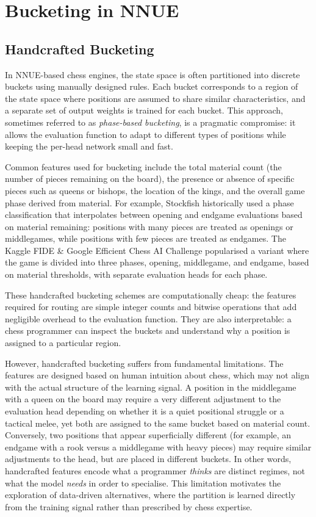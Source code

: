 \section{Bucketing in NNUE}\label{sec:nnue-bucketing}

\subsection{Handcrafted Bucketing}\label{sec:handcrafted-bucketing}

In NNUE-based chess engines, the state space is often partitioned into discrete buckets using manually designed rules. Each bucket corresponds to a region of the state space where positions are assumed to share similar characteristics, and a separate set of output weights is trained for each bucket. This approach, sometimes referred to as \emph{phase-based bucketing}, is a pragmatic compromise: it allows the evaluation function to adapt to different types of positions while keeping the per-head network small and fast.

Common features used for bucketing include the total material count (the number of pieces remaining on the board), the presence or absence of specific pieces such as queens or bishops, the location of the kings, and the overall game phase derived from material. For example, Stockfish historically used a phase classification that interpolates between opening and endgame evaluations based on material remaining: positions with many pieces are treated as openings or middlegames, while positions with few pieces are treated as endgames. The Kaggle FIDE \& Google Efficient Chess AI Challenge popularised a variant where the game is divided into three phases, opening, middlegame, and endgame, based on material thresholds, with separate evaluation heads for each phase.

These handcrafted bucketing schemes are computationally cheap: the features required for routing are simple integer counts and bitwise operations that add negligible overhead to the evaluation function. They are also interpretable: a chess programmer can inspect the buckets and understand why a position is assigned to a particular region.

However, handcrafted bucketing suffers from fundamental limitations. The features are designed based on human intuition about chess, which may not align with the actual structure of the learning signal. A position in the middlegame with a queen on the board may require a very different adjustment to the evaluation head depending on whether it is a quiet positional struggle or a tactical melee, yet both are assigned to the same bucket based on material count. Conversely, two positions that appear superficially different (for example, an endgame with a rook versus a middlegame with heavy pieces) may require similar adjustments to the head, but are placed in different buckets. In other words, handcrafted features encode what a programmer \emph{thinks} are distinct regimes, not what the model \emph{needs} in order to specialise. This limitation motivates the exploration of data-driven alternatives, where the partition is learned directly from the training signal rather than prescribed by chess expertise.

